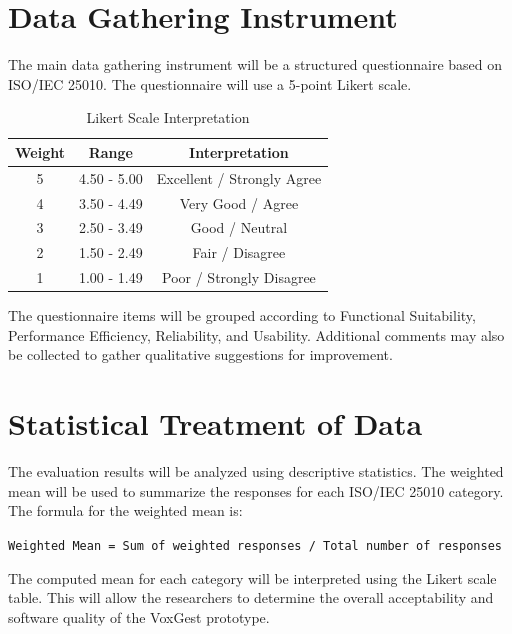 \section{Data Gathering Instrument}

The main data gathering instrument will be a structured questionnaire based on ISO/IEC 25010. The questionnaire will use a 5-point Likert scale.

\begin{table}[h!]
\caption{Likert Scale Interpretation}
\vspace{-1em}
\begin{center}
\begin{tabular}{|| c c c ||} 
 \hline
 Weight & Range & Interpretation \\ [0.5ex] 
 \hline\hline
 5 & 4.50 - 5.00 & Excellent / Strongly Agree \\ 
 \hline
 4 & 3.50 - 4.49 & Very Good / Agree \\ 
 \hline
 3 & 2.50 - 3.49 & Good / Neutral \\ 
 \hline
 2 & 1.50 - 2.49 & Fair / Disagree \\ 
 \hline
 1 & 1.00 - 1.49 & Poor / Strongly Disagree \\ [1ex] 
 \hline
\end{tabular}
\end{center}
\end{table}

The questionnaire items will be grouped according to Functional Suitability, Performance Efficiency, Reliability, and Usability. Additional comments may also be collected to gather qualitative suggestions for improvement.

\section{Statistical Treatment of Data}

The evaluation results will be analyzed using descriptive statistics. The weighted mean will be used to summarize the responses for each ISO/IEC 25010 category. The formula for the weighted mean is:

\begin{center}
\texttt{Weighted Mean = Sum of weighted responses / Total number of responses}
\end{center}

The computed mean for each category will be interpreted using the Likert scale table. This will allow the researchers to determine the overall acceptability and software quality of the VoxGest prototype.

